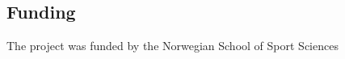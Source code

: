 \documentclass[pdflatex,sn-nature]{sn-jnl}%
\theoremstyle{thmstyleone}%
\theoremstyle{thmstyletwo}%
\theoremstyle{thmstylethree}%
\begin{document}
\subsection{Funding}
The project was funded by the Norwegian School of Sport Sciences

 






\end{document}
